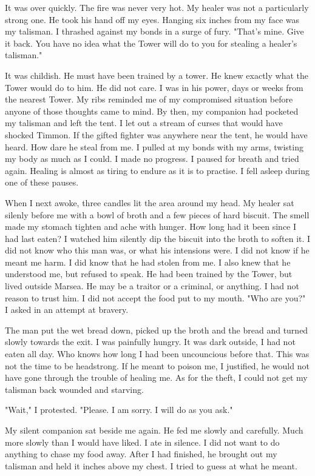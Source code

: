 \documentclass{article}
\begin{document}
It was over quickly. The fire was never very hot. My healer was not a particularly strong one. He took his hand off my eyes. Hanging six inches from my face was my talisman. I thrashed against my bonds in a surge of fury. "That's mine. Give it back. You have no idea what the Tower will do to you for stealing a healer's talisman."

It was childish. He must have been trained by a tower. He knew exactly what the Tower would do to him. He did not care. I was in his power, days or weeks from the nearest Tower. My ribs reminded me of my compromised situation before anyone of those thoughts came to mind. By then, my companion had pocketed my talisman and left the tent. I let out a stream of curses that would have shocked Timmon. If the gifted fighter was anywhere near the tent, he would have heard. How dare he steal from me. I pulled at my bonds with my arms, twisting my body as much as I could. I made no progress. I paused for breath and tried again. Healing is almost as tiring to endure as it is to practise. I fell asleep during one of these pauses.

When I next awoke, three candles lit the area around my head. My healer sat silenly before me with a bowl of broth and a few pieces of hard biscuit. The smell made my stomach tighten and ache with hunger. How long had it been since I had last eaten? I watched him silently dip the biscuit into the broth to soften it. I did not know who this man was, or what his intensions were. I did not know if he meant me harm. I did know that he had stolen from me. I also knew that he understood me, but refused to speak. He had been trained by the Tower, but lived outside Marsea. He may be a traitor or a criminal, or anything. I had not reason to trust him. I did not accept the food put to my mouth. "Who are you?" I asked in an attempt at bravery. 

The man put the wet bread down, picked up the broth and the bread and turned slowly towards the exit. I was painfully hungry. It was dark outside, I had not eaten all day. Who knows how long I had been uncouncious before that. This was not the time to be headstrong. If he meant to poison me, I justified, he would not have gone through the trouble of healing me. As for the theft, I could not get my talisman back wounded and starving.

"Wait," I protested. "Please. I am sorry. I will do as you ask."

My silent companion sat beside me again. He fed me slowly and carefully. Much more slowly than I would have liked. I ate in silence. I did not want to do anything to chase my food away. After I had finished, he brought out my talisman and held it inches above my chest. I tried to guess at what he meant. 
\end{document}
